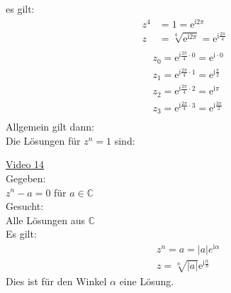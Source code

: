 es gilt:\\
\begin{align*}
z^4&=1=\mathrm{e}^{\mathrm{i}2\pi}\\
z&=\sqrt[4]{\mathrm{e}^{\mathrm{i}2\pi}}=\mathrm{e}^{\mathrm{i}\frac{2\pi}{4}}\\
\end{align*}
\begin{align*}
&z_0=\mathrm{e}^{\mathrm{i}\frac{2\pi}{4}\cdot 0}=\mathrm{e}^{\mathrm{i}\cdot 0}\\
&z_1=\mathrm{e}^{\mathrm{i}\frac{2\pi}{4}\cdot 1}=\mathrm{e}^{\mathrm{i}\frac{\pi}{2}}\\
&z_2=\mathrm{e}^{\mathrm{i}\frac{2\pi}{4}\cdot 2}=\mathrm{e}^{\mathrm{i}\pi}\\
&z_3=\mathrm{e}^{\mathrm{i}\frac{2\pi}{4}\cdot 3}=\mathrm{e}^{\mathrm{i}\frac{3\pi}{2}}\\
\end{align*}
Allgemein gilt dann:\\
Die Lösungen für $ z^n=1 $ sind:\\
\begin{center}
\end{center}
\newpage
\noindent
\href{https://youtu.be/Uqpu2trEjM4}{Video 14}\\
Gegeben:\\$ z^n-a=0 $ für $ a\in  \mathbb{C} $\\
Gesucht: \\Alle Lösungen aus $  \mathbb{C}$\\
Es gilt:\\
\begin{align*}
&z^n=a=|a|e^{\mathrm{i}\alpha}\\
&z=\sqrt[n]{|a|}\mathrm{e}^{\mathrm{i} \frac{\alpha}{n}}
\end{align*}
Dies ist für den Winkel $ \alpha $ eine Lösung.\\
